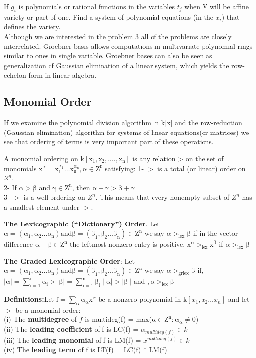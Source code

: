 \documentclass[11pt]{article}
\begin{document}
If $g_i$ is polynomials or rational functions in the variables $t_j$ when V will be affine variety or part of one. Find a system of polynomial equations (in the $x_i$)
that defines the variety.\\

Although we are interested in the problem 3 all of the problems are closely interrelated. Groebner basis allows computations in multivariate polynomial rings similar to ones in single variable. Groebner bases can also be seen as generalization of Gaussian elimination of a linear system, which yields the row-echelon form in linear algebra.

\subsection{Monomial Order}
If we examine the polynomial division algorithm in k[x] and the row-reduction (Gaussian elimination) algorithm for systems of linear equations(or matrices) we see that ordering of terms is very important part of these operations.

A monomial ordering on $\mathrm{k[x_1,x_2,....,x_n]}$ is any relation > on the set of monomials $\mathrm{x^\alpha = x_1^{\alpha_1} \ldots x_n^{\alpha_n} , \alpha \in Z^n}$ satisfying:
1- $>$ is a total (or linear) order on $Z^n$.\\
2- If $\mathrm{\alpha > \beta}$ and $\mathrm{\gamma \in Z^n}$, then $\mathrm{\alpha + \gamma > \beta + \gamma}$ \\
3- $>$ is a well-ordering on $Z^n$. This means that every nonempty subset of $Z^n$ has a smallest element under $>$.

\textbf{The Lexicographic (“Dictionary”) Order}: Let $\mathrm{\alpha = (\alpha_1,\alpha_2 \ldots \alpha_n) and \beta = (\beta_1,\beta_2 \ldots \beta_n) \in Z^n}$ we say $\mathrm{\alpha >_{lex} \beta}$ if in the vector difference $\mathrm{\alpha - \beta \in Z^n}$ the leftmost nonzero entry is positive. $\mathrm{x^\alpha >_{lex} x^\beta}$ if $\mathrm{\alpha >_{lex} \beta}$

\textbf{The Graded Lexicographic Order}: Let $\mathrm{\alpha = (\alpha_1,\alpha_2 \ldots \alpha_n) and \beta = (\beta_1,\beta_2 \ldots \beta_n) \in Z^n}$ we say $\mathrm{\alpha >_{grlex} \beta}$ if,\\
  $\mathrm{\mid{\alpha}\mid = \sum_{i=1}^{n}\alpha_i > \mid{\beta}\mid = \sum_{i=1}^{n}\beta_i}$ 
  $\mathrm{|\mid{\alpha}\mid > \mid{\beta}\mid \text{and } , \alpha >_{lex} \beta}$

\textbf{Definitions:}Let $\mathrm{f=\sum_{\alpha}\alpha_\alpha x^\alpha}$ be a nonzero polynomial in k$[x_1,x_2 \ldots x_n]$ and let $>$ be a monomial order:\\
(i) The \textbf{multidegree} of $f$ is multideg(f) = max($\mathrm{\alpha \in Z^n:\alpha_\alpha \neq 0}$) \\
(ii) The \textbf{leading coefficient} of f is LC(f) = $\alpha_{multideg(f) }\in k$\\
(iii) The \textbf{leading monomial} of f is LM(f) = $x^{multideg(f)}\in k$\\
(iv) The \textbf{leading term} of f is LT(f) = LC(f) * LM(f)\\
\end{document}
